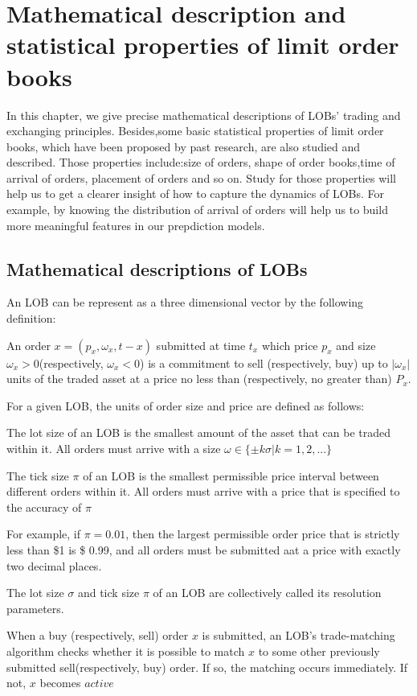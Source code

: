 \chapter{Mathematical description and statistical properties of limit order books  }
In this chapter, we give precise mathematical descriptions of LOBs' trading and exchanging principles. 
Besides,some basic statistical properties of limit order books, which have been proposed by past research, are also studied and described. Those properties include:size of orders, shape of order books,time of arrival of orders, placement of orders and so on. Study for those properties will help us to get a clearer insight of how to capture the dynamics of LOBs. For example, by knowing the distribution of arrival of orders will help us to build more meaningful features in our prepdiction models. 
  
\section{Mathematical descriptions of LOBs}
An LOB can be represent as a three dimensional vector by the following definition:
\begin{defn}
An order $x=(p_x, \omega_x,t-x)$ submitted at time $t_x$ which price $p_x$ and size $\omega_x>0$(respectively, $\omega_x<0$) is a commitment to sell (respectively, buy) up to $|\omega_x|$ units of the traded asset at a price no less than (respectively, no greater than) $P_x$.
\end{defn}

For a given LOB, the units of order size and price are defined as follows:
\begin{defn}
The lot size of an LOB is the smallest amount of the asset that can be traded within it. All orders must arrive with a size $\omega \in \{\pm k\sigma|k=1,2,...\}$
\end{defn}

\begin{defn}
The tick size $\pi$ of an LOB is the smallest permissible price interval between different orders within it. All orders must arrive with a price that is specified to the accuracy of $\pi$
\end{defn}

For example, if $\pi=0.01$, then the largest permissible order price that is strictly less than \$1 is \$ 0.99, and all orders must be submitted aat a price with exactly two decimal places.
\begin{defn}
The lot size $\sigma$ and tick size $\pi$ of an LOB are collectively called its resolution parameters.
\end{defn} 
\begin{defn}
When a buy (respectively, sell) order $x$ is submitted, an LOB's trade-matching algorithm checks whether it is possible to match $x$ to some other previously submitted sell(respectively, buy) order. If so, the matching occurs immediately. If not, $x$ becomes $active$
\end{defn}

